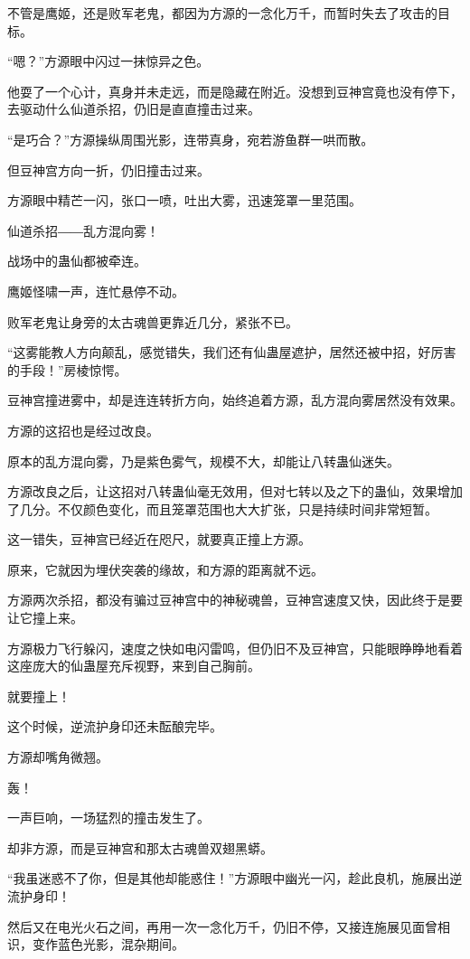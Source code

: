 \begin{this_body}
不管是鹰姬，还是败军老鬼，都因为方源的一念化万千，而暂时失去了攻击的目标。

“嗯？”方源眼中闪过一抹惊异之色。

他耍了一个心计，真身并未走远，而是隐藏在附近。没想到豆神宫竟也没有停下，去驱动什么仙道杀招，仍旧是直直撞击过来。

“是巧合？”方源操纵周围光影，连带真身，宛若游鱼群一哄而散。

但豆神宫方向一折，仍旧撞击过来。

方源眼中精芒一闪，张口一喷，吐出大雾，迅速笼罩一里范围。

仙道杀招――乱方混向雾！

战场中的蛊仙都被牵连。

鹰姬怪啸一声，连忙悬停不动。

败军老鬼让身旁的太古魂兽更靠近几分，紧张不已。

“这雾能教人方向颠乱，感觉错失，我们还有仙蛊屋遮护，居然还被中招，好厉害的手段！”房棱惊愕。

豆神宫撞进雾中，却是连连转折方向，始终追着方源，乱方混向雾居然没有效果。

方源的这招也是经过改良。

原本的乱方混向雾，乃是紫色雾气，规模不大，却能让八转蛊仙迷失。

方源改良之后，让这招对八转蛊仙毫无效用，但对七转以及之下的蛊仙，效果增加了几分。不仅颜色变化，而且笼罩范围也大大扩张，只是持续时间非常短暂。

这一错失，豆神宫已经近在咫尺，就要真正撞上方源。

原来，它就因为埋伏突袭的缘故，和方源的距离就不远。

方源两次杀招，都没有骗过豆神宫中的神秘魂兽，豆神宫速度又快，因此终于是要让它撞上来。

方源极力飞行躲闪，速度之快如电闪雷鸣，但仍旧不及豆神宫，只能眼睁睁地看着这座庞大的仙蛊屋充斥视野，来到自己胸前。

就要撞上！

这个时候，逆流护身印还未酝酿完毕。

方源却嘴角微翘。

轰！

一声巨响，一场猛烈的撞击发生了。

却非方源，而是豆神宫和那太古魂兽双翅黑蟒。

“我虽迷惑不了你，但是其他却能惑住！”方源眼中幽光一闪，趁此良机，施展出逆流护身印！

然后又在电光火石之间，再用一次一念化万千，仍旧不停，又接连施展见面曾相识，变作蓝色光影，混杂期间。


\end{this_body}
